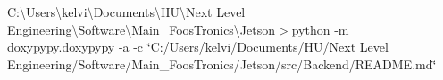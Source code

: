 C\+:\textbackslash{}\+Users\textbackslash{}kelvi\textbackslash{}\+Documents\textbackslash{}\+HU\textbackslash{}\+Next Level Engineering\textbackslash{}\+Software\textbackslash{}\+Main\+\_\+\+Foos\+Tronics\textbackslash{}\+Jetson$>$python -\/m doxypypy.\+doxypypy -\/a -\/c \char`\"{}\+C\+:/\+Users/kelvi/\+Documents/\+H\+U/\+Next Level Engineering/\+Software/\+Main\+\_\+\+Foos\+Tronics/\+Jetson/src/\+Backend/\+R\+E\+A\+D\+M\+E.\+md\char`\"{} 